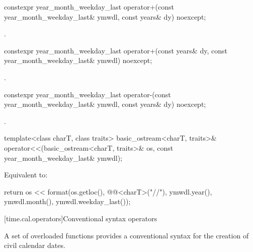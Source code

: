%
\begin{itemdecl}
constexpr year_month_weekday_last
  operator+(const year_month_weekday_last& ymwdl, const years& dy) noexcept;
\end{itemdecl}

\begin{itemdescr}
\pnum
\returns
{}.
\end{itemdescr}

%
\begin{itemdecl}
constexpr year_month_weekday_last
  operator+(const years& dy, const year_month_weekday_last& ymwdl) noexcept;
\end{itemdecl}

\begin{itemdescr}
\pnum
\returns
{}.
\end{itemdescr}

%
\begin{itemdecl}
constexpr year_month_weekday_last
  operator-(const year_month_weekday_last& ymwdl, const years& dy) noexcept;
\end{itemdecl}

\begin{itemdescr}
\pnum
\returns
{}.
\end{itemdescr}

%
\begin{itemdecl}
template<class charT, class traits>
  basic_ostream<charT, traits>&
    operator<<(basic_ostream<charT, traits>& os, const year_month_weekday_last& ymwdl);
\end{itemdecl}

\begin{itemdescr}
\pnum
\effects
Equivalent to:
\begin{codeblock}
return os << format(os.getloc(), @@<charT>("{}/{}/{}"),
                    ymwdl.year(), ymwdl.month(), ymwdl.weekday_last());
\end{codeblock}
\end{itemdescr}

[time.cal.operators]{Conventional syntax operators}

\pnum
A set of overloaded  functions provides
a conventional syntax for the creation of civil calendar dates.

